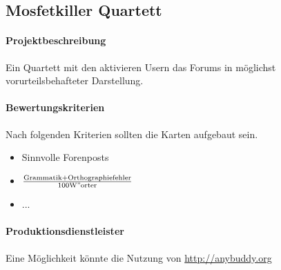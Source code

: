 \subsection{Mosfetkiller Quartett}
\paragraph{Projektbeschreibung} Ein Quartett mit den aktivieren Usern das Forums in möglichst vorurteilsbehafteter Darstellung. 
\paragraph{Bewertungskriterien} Nach folgenden Kriterien sollten die Karten aufgebaut sein.
\begin{itemize}
	\item Sinnvolle Forenposts
	\item $\mathrm{\frac{Grammatik+Orthographiefehler}{100 W"orter}}$
	\item ...
\end{itemize}

\paragraph{Produktionsdienstleister} Eine Möglichkeit könnte die Nutzung von \url{http://anybuddy.org}
